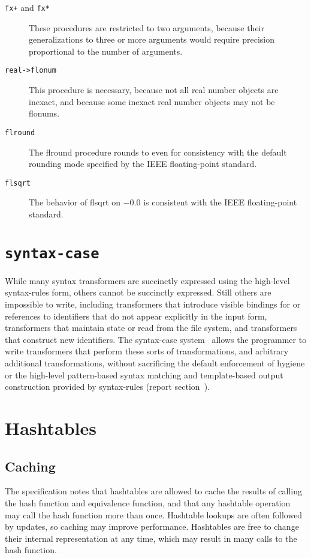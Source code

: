 \documentclass[twoside,twocolumn]{algol60}
\begin{document}
\begin{description}
\item[{\tt fx+} and {\tt fx*}]
These procedures are restricted to two arguments, because their
generalizations to three or more arguments would require
precision proportional to the number of arguments.
\item[{\tt real->flonum}]
This procedure is necessary, because not all real number objects are inexact, and
because some inexact real number objects may not be flonums.
\item[{\tt flround}]
The {\cf flround} procedure rounds to even for consistency with the default rounding
mode specified by the IEEE floating-point standard.
\item[{\tt flsqrt}]
The behavior of {\cf flsqrt} on $-0.0$ is consistent with the IEEE
floating-point standard.
\end{description}

\chapter{{\tt syntax-case}}

While many syntax transformers are succinctly expressed using the
high-level {\cf syntax-rules} form, others cannot be succinctly expressed.
Still others are impossible
to write, including transformers that introduce visible bindings for or references
to identifiers that do not appear explicitly in the input form, transformers that
maintain state or read from the file system, and transformers that construct new
identifiers.
The {\cf syntax-case} system~\cite{syntacticabstraction} 
allows the programmer to write transformers that perform these sorts of
transformations, and arbitrary additional transformations, without
sacrificing the default enforcement of hygiene or the high-level
pattern-based syntax matching and template-based output construction
provided by {\cf syntax-rules} (report
section~).

\chapter{Hashtables}

\section{Caching}

The specification notes that hashtables are allowed to cache the
results of calling the hash function and equivalence function, and
that any hashtable operation may call the hash function more than
once.  Hashtable lookups are often followed by updates, so caching may
improve performance.  Hashtables are free to change their internal
representation at any time, which may result in many calls to the hash
function.
\end{document}
